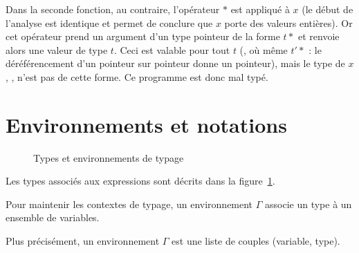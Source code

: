 Dans la seconde fonction, au contraire, l'opérateur $*$ est appliqué à $x$ (le
début de l'analyse est identique et permet de conclure que $x$ porte des valeurs
entières). Or cet opérateur prend un argument d'un type pointeur de la forme
$t*$ et renvoie alors une valeur de type $t$. Ceci est valable pour tout $t$
(\tInt, \tFloat où même $t'*$ : le déréférencement d'un pointeur sur pointeur
donne un pointeur), mais le type de $x$, \tInt, n'est pas de cette forme. Ce
programme est donc mal typé.

\section{Environnements et notations}

\begin{figure}



  \caption{Types et environnements de typage}

  \label{fig:les-types}

\end{figure}

Les types associés aux expressions sont décrits dans la
figure~\ref{fig:les-types}.

Pour maintenir les contextes de typage, un environnement $Γ$ associe un type à
un ensemble de variables.

Plus précisément, un environnement $Γ$ est une liste de couples (variable,
type).

